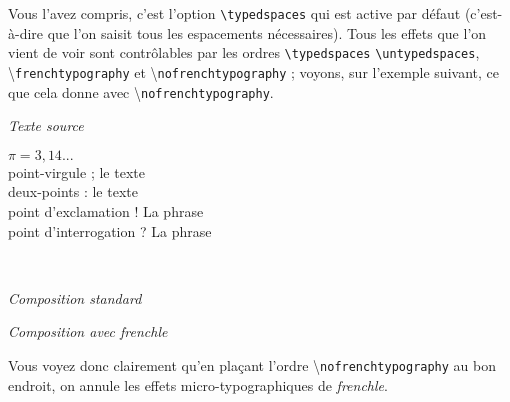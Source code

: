 \documentclass[a4paper,12pt,openright]{article}
\begin{document}
Vous l’avez compris, c’est l’option \verb|\typedspaces| qui est active par défaut
(c’est-à-dire que l’on saisit tous les espacements nécessaires).
Tous les effets que l’on vient de voir sont contrôlables par les ordres \verb|\typedspaces|
\verb|\untypedspaces|, 
 \backslash\texttt{frenchtypography}
et  \backslash\texttt{nofrenchtypography} ; voyons, sur l’exemple suivant, ce que
cela donne avec  \backslash\texttt{nofrenchtypography}.
\begin{center}
\textit{Texte source}\\
\begin{boxedverbatim}
{\nofrenchtypography
$\pi=3,14...$\\
point-virgule ; le texte\\
deux-points : le texte\\
point d’exclamation ! La phrase\\
point d’interrogation ? La phrase\\
}
\end{boxedverbatim}
\\[.5em]
\begin{minipage}{60mm}
\begin{center}
\textit{Composition standard}
\end{center}
\end{minipage}
\begin{minipage}{60mm}
\begin{center}
\textit{Composition avec frenchle}
\end{center}
\end{minipage}
\end{center}
\rule{0pt}{1em}
\frenchtypography\frenchlayout
Vous voyez donc clairement qu’en plaçant l’ordre 
 \backslash\texttt{nofrenchtypography} au
bon endroit, on annule les effets micro-typographiques de \textit{frenchle}.
\end{document}
